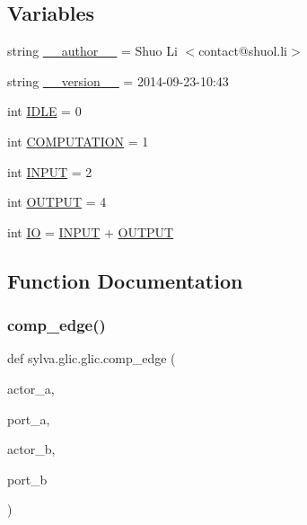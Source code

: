 \subsection*{Variables}
\begin{DoxyCompactItemize}
\item 
string \hyperlink{namespacesylva_1_1glic_1_1glic_a57d291e9c4a03b4cd7a7bee3615beab0}{\+\_\+\+\_\+author\+\_\+\+\_\+} = \textquotesingle{}Shuo Li $<$contact@shuol.\+li$>$\textquotesingle{}
\item 
string \hyperlink{namespacesylva_1_1glic_1_1glic_a5754d69bc48a2eae07aba1e13ba72d54}{\+\_\+\+\_\+version\+\_\+\+\_\+} = \textquotesingle{}2014-\/09-\/23-\/10\+:43\textquotesingle{}
\item 
int \hyperlink{namespacesylva_1_1glic_1_1glic_ada3197b7ecf6f2b781f0f358b482a2b4}{I\+D\+LE} = 0
\item 
int \hyperlink{namespacesylva_1_1glic_1_1glic_a7ed9d88425bdb7584d63853dc31381f2}{C\+O\+M\+P\+U\+T\+A\+T\+I\+ON} = 1
\item 
int \hyperlink{namespacesylva_1_1glic_1_1glic_ab7e66a35c60e9c2fbeb69191240a7dc9}{I\+N\+P\+UT} = 2
\item 
int \hyperlink{namespacesylva_1_1glic_1_1glic_ad6e11d2ff626d576dddd38f99952a31a}{O\+U\+T\+P\+UT} = 4
\item 
int \hyperlink{namespacesylva_1_1glic_1_1glic_a9c96f3856c9e68f1b545a0f7ee5b68fa}{IO} = \hyperlink{namespacesylva_1_1glic_1_1glic_ab7e66a35c60e9c2fbeb69191240a7dc9}{I\+N\+P\+UT} + \hyperlink{namespacesylva_1_1glic_1_1glic_ad6e11d2ff626d576dddd38f99952a31a}{O\+U\+T\+P\+UT}
\end{DoxyCompactItemize}


\subsection{Function Documentation}
\mbox{\label{namespacesylva_1_1glic_1_1glic_aa441c66a03eed575ba427151f3567a0e}} 
\subsubsection{\texorpdfstring{comp\+\_\+edge()}{comp\_edge()}}
{\footnotesize\ttfamily def sylva.\+glic.\+glic.\+comp\+\_\+edge (\begin{DoxyParamCaption}\item[{}]{actor\+\_\+a,  }\item[{}]{port\+\_\+a,  }\item[{}]{actor\+\_\+b,  }\item[{}]{port\+\_\+b }\end{DoxyParamCaption})}

